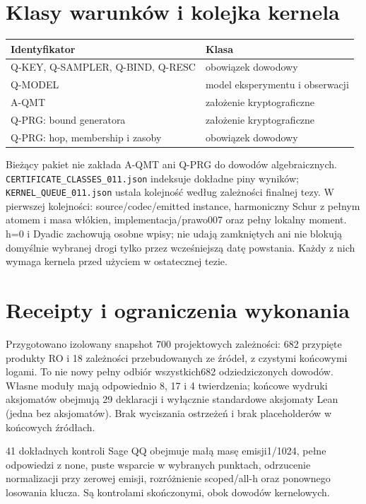 \documentclass[11pt,a4paper]{article}
\newcommand{\code}[1]{\nolinkurl{#1}}
\begin{document}
\section{Klasy warunków i kolejka kernela}
\begin{center}\begin{tabular}{ll}\toprule
Identyfikator & Klasa\\\midrule
Q-KEY, Q-SAMPLER, Q-BIND, Q-RESC & obowiązek dowodowy\\
Q-MODEL & model eksperymentu i obserwacji\\
A-QMT & założenie kryptograficzne\\
Q-PRG: bound generatora & założenie kryptograficzne\\
Q-PRG: hop, membership i zasoby & obowiązek dowodowy\\\bottomrule
\end{tabular}\end{center}
Bieżący pakiet nie zakłada A-QMT ani Q-PRG do dowodów algebraicznych.
\code{CERTIFICATE_CLASSES_011.json} indeksuje dokładne piny wyników;
\code{KERNEL_QUEUE_011.json} ustala kolejność według zależności finalnej tezy.
W pierwszej kolejności: source/codec/emitted instance, harmoniczny Schur
z pełnym atomem i masa włókien, implementacja/prawo007 oraz pełny lokalny
moment. h=0 i Dyadic zachowują osobne wpisy; nie udają zamkniętych ani nie
blokują domyślnie wybranej drogi tylko przez wcześniejszą datę powstania.
Każdy z nich wymaga kernela przed użyciem w ostatecznej tezie.

\section{Receipty i ograniczenia wykonania}
Przygotowano izolowany snapshot 700 projektowych zależności: 682 przypięte
produkty RO i 18 zależności przebudowanych ze źródeł, z czystymi końcowymi
logami. To nie nowy pełny odbiór wszystkich682 odziedziczonych dowodów.
Własne moduły mają odpowiednio 8, 17 i 4 twierdzenia; końcowe wydruki aksjomatów
obejmują 29 deklaracji i wyłącznie standardowe aksjomaty Lean (jedna bez aksjomatów).
Brak wyciszania ostrzeżeń i brak placeholderów w końcowych źródłach.

41 dokładnych kontroli Sage QQ obejmuje małą masę emisji1/1024,
pełne odpowiedzi z none, puste wsparcie w wybranych punktach, odrzucenie
normalizacji przy zerowej emisji, rozróżnienie scoped/all-h oraz ponownego
losowania klucza. Są kontrolami skończonymi, obok dowodów kernelowych.
\end{document}
